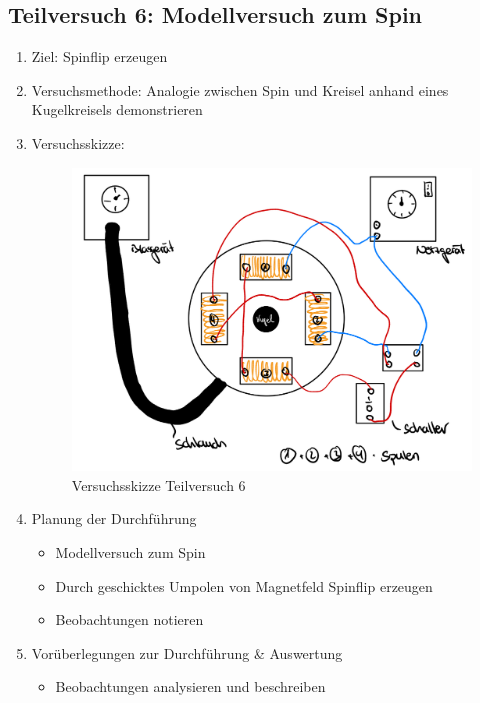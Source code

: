\documentclass{article}
\begin{document}
\newpage

\subsection{Teilversuch 6: Modellversuch zum Spin}
\begin{enumerate}[label = (\Roman*)]
    \item Ziel: Spinflip erzeugen
    
    \item Versuchsmethode: Analogie zwischen Spin und Kreisel anhand eines Kugelkreisels demonstrieren
    
    \item Versuchsskizze:
    
        \begin{figure}[H]
        \centering
        \includegraphics[width=0.7\linewidth]{Abbildungen/TV6.jpeg}
        \caption{Versuchsskizze Teilversuch 6}
        \end{figure}

    \item Planung der Durchführung
        \begin{itemize}
           \item Modellversuch zum Spin
           \item Durch geschicktes Umpolen von Magnetfeld Spinflip erzeugen
           \item Beobachtungen notieren
        \end{itemize}

    \item Vorüberlegungen zur Durchführung \& Auswertung
        \begin{itemize}
            \item Beobachtungen analysieren und beschreiben
        \end{itemize}
        
\end{enumerate}
\end{document}
